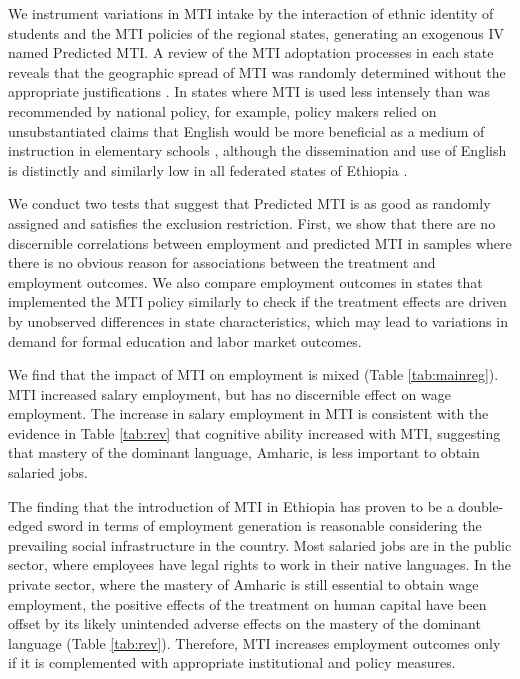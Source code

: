 We instrument variations in MTI intake by the interaction of ethnic identity of students and the MTI policies of the regional states, generating an exogenous IV named Predicted MTI. A review of the MTI adoptation processes in each state reveals that the geographic spread of MTI was randomly determined without the appropriate justifications \citep{Heugh2007}. In states where MTI is used less intensely than was recommended by national policy, for example, policy makers relied on unsubstantiated claims that English would be more beneficial as a medium of instruction in elementary schools \citep{Heugh2007}, although the dissemination and use of English is distinctly and similarly low in all federated states of Ethiopia \citep{gerencheal2019foreign}. 

We conduct two tests that suggest that Predicted MTI is as good as randomly assigned and satisfies the exclusion restriction. First, we show that there are no discernible correlations between employment and predicted MTI in samples where there is no obvious reason for associations between the treatment and employment outcomes. We also compare employment outcomes in states that implemented the MTI policy similarly to check if the treatment effects are driven by unobserved differences in state characteristics, which may lead to variations in demand for formal education and labor market outcomes.

We find that the impact of MTI on employment is mixed (Table \ref{tab:mainreg}).  MTI increased salary employment, but has no discernible effect on wage employment. The increase in salary employment in MTI is consistent with the evidence in Table \ref{tab:rev} that cognitive ability increased with MTI, suggesting that mastery of the dominant language, Amharic, is less important to obtain salaried jobs. 

The finding that the introduction of MTI in Ethiopia has proven to be a double-edged sword in terms of employment generation is reasonable considering the prevailing social infrastructure in the country. Most salaried jobs are in the public sector, where employees have legal rights to work in their native languages. In the private sector, where the mastery of Amharic is still essential to obtain wage employment, the positive effects of the treatment on human capital have been offset by its likely unintended adverse effects on the mastery of the dominant language (Table \ref{tab:rev}). Therefore, MTI increases employment outcomes only if it is complemented with appropriate institutional and policy measures.

